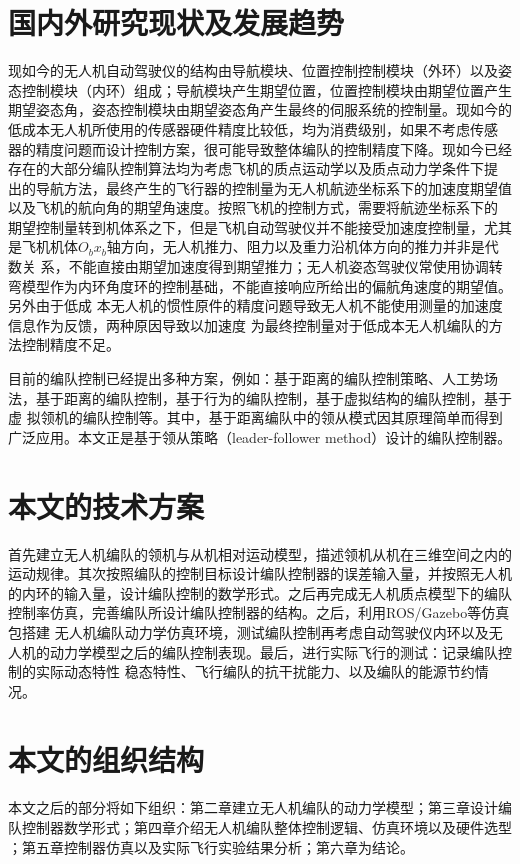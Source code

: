 \section{国内外研究现状及发展趋势}
现如今的无人机自动驾驶仪的结构由导航模块、位置控制控制模块（外环）以及姿态控制模块（内环）组成；导航模块产生期望位置，位置控制模块由期望位置产生
期望姿态角，姿态控制模块由期望姿态角产生最终的伺服系统的控制量。现如今的低成本无人机所使用的传感器硬件精度比较低，均为消费级别，如果不考虑传感
器的精度问题而设计控制方案，很可能导致整体编队的控制精度下降。现如今已经存在的大部分编队控制算法均为考虑飞机的质点运动学以及质点动力学条件下提
出的导航方法，最终产生的飞行器的控制量为无人机航迹坐标系下的加速度期望值以及飞机的航向角的期望角速度。按照飞机的控制方式，需要将航迹坐标系下的
期望控制量转到机体系之下，但是飞机自动驾驶仪并不能接受加速度控制量，尤其是飞机机体$O_bx_b$轴方向，无人机推力、阻力以及重力沿机体方向的推力并非是代数关
系，不能直接由期望加速度得到期望推力；无人机姿态驾驶仪常使用协调转弯模型作为内环角度环的控制基础，不能直接响应所给出的偏航角速度的期望值。另外由于低成
本无人机的惯性原件的精度问题导致无人机不能使用测量的加速度信息作为反馈，两种原因导致以加速度
为最终控制量对于低成本无人机编队的方法控制精度不足。

目前的编队控制已经提出多种方案，例如：基于距离的编队控制策略、人工势场法，基于距离的编队控制，基于行为的编队控制，基于虚拟结构的编队控制，基于虚
拟领机的编队控制等。其中，基于距离编队中的领从模式因其原理简单而得到广泛应用。本文正是基于领从策略（leader-follower method）设计的编队控制器。
\section{本文的技术方案}
首先建立无人机编队的领机与从机相对运动模型，描述领机从机在三维空间之内的运动规律。其次按照编队的控制目标设计编队控制器的误差输入量，并按照无人机
的内环的输入量，设计编队控制的数学形式。之后再完成无人机质点模型下的编队控制率仿真，完善编队所设计编队控制器的结构。之后，利用ROS/Gazebo等仿真包搭建
无人机编队动力学仿真环境，测试编队控制再考虑自动驾驶仪内环以及无人机的动力学模型之后的编队控制表现。最后，进行实际飞行的测试：记录编队控制的实际动态特性
稳态特性、飞行编队的抗干扰能力、以及编队的能源节约情况。
\section{本文的组织结构}
本文之后的部分将如下组织：第二章建立无人机编队的动力学模型；第三章设计编队控制器数学形式；第四章介绍无人机编队整体控制逻辑、仿真环境以及硬件选型
；第五章控制器仿真以及实际飞行实验结果分析；第六章为结论。
